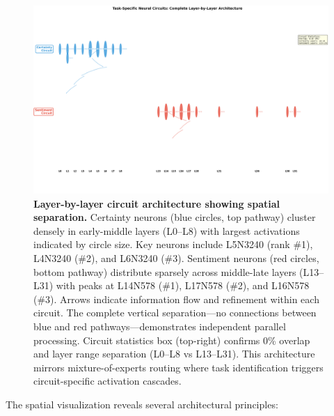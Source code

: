\documentclass{article}
\begin{document}
\begin{figure}[t]
\centering
\includegraphics[width=\textwidth]{./figures/circuit_layer_architecture.png}
\caption{\textbf{Layer-by-layer circuit architecture showing spatial separation.} Certainty neurons (blue circles, top pathway) cluster densely in early-middle layers (L0--L8) with largest activations indicated by circle size. Key neurons include L5N3240 (rank \#1), L4N3240 (\#2), and L6N3240 (\#3). Sentiment neurons (red circles, bottom pathway) distribute sparsely across middle-late layers (L13--L31) with peaks at L14N578 (\#1), L17N578 (\#2), and L16N578 (\#3). Arrows indicate information flow and refinement within each circuit. The complete vertical separation—no connections between blue and red pathways—demonstrates independent parallel processing. Circuit statistics box (top-right) confirms 0\% overlap and layer range separation (L0--L8 vs L13--L31). This architecture mirrors mixture-of-experts routing where task identification triggers circuit-specific activation cascades.}
\label{fig:architecture}
\end{figure}

The spatial visualization reveals several architectural principles:
\end{document}
